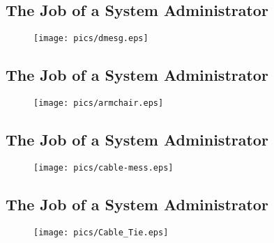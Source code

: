 \documentclass[xga]{xdvislides}
\begin{document}
\subsection{The Job of a System Administrator}
\vspace*{\fill}
\begin{figure}[hb]
	\begin{center}
		\texttt{[image: pics/dmesg.eps]} \\
	\end{center}
\end{figure}
\vspace*{\fill}

\subsection{The Job of a System Administrator}
\vspace*{\fill}
\begin{figure}[hb]
	\begin{center}
		\texttt{[image: pics/armchair.eps]} \\
	\end{center}
\end{figure}
\vspace*{\fill}

\subsection{The Job of a System Administrator}
\vspace*{\fill}
\begin{figure}[hb]
	\begin{center}
		\texttt{[image: pics/cable-mess.eps]} \\
	\end{center}
\end{figure}
\vspace*{\fill}

\subsection{The Job of a System Administrator}
\vspace*{\fill}
\begin{figure}[hb]
	\begin{center}
		\texttt{[image: pics/Cable\_Tie.eps]} \\
	\end{center}
\end{figure}
\vspace*{\fill}
\end{document}
